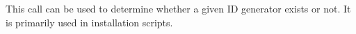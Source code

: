 This call can be used to determine whether a given ID generator exists or not. It is primarily used
in installation scripts.
